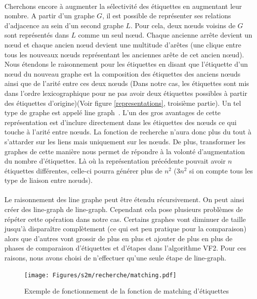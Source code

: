 \documentclass[12pt,french,twoside]{report}
\begin{document}
\paragraph{}Cherchons encore à augmenter la sélectivité des étiquettes en augmentant leur nombre. A partir d'un graphe $G$, il est
possible de représenter ses relations d'adjacence au sein d'un second graphe $L$. Pour cela, deux n\oe{}uds voisins de $G$ sont
représentés dans $L$ comme un seul n\oe{}ud. Chaque ancienne arrête devient un n\oe{}ud et chaque ancien n\oe{}ud devient une multitude
d'arêtes (une clique entre tous les nouveaux n\oe{}uds représentant les anciennes arête de cet ancien n\oe{}ud). Nous étendons le 
raisonnement pour les étiquettes en disant que l'étiquette d'un n\oe{}ud du nouveau graphe est la composition des étiquettes des anciens
n\oe{}uds ainsi que de l'arité entre ces deux n\oe{}uds (Dans notre cas, les étiquettes sont mis dans l'ordre lexicographique pour ne pas
avoir deux étiquettes possibles à partir des étiquettes d'origine)(Voir figure \ref{representations},
troisième partie). Un tel type de graphe est appelé line graph~\cite{orlin_line-digraphs_1978}. L'un des
gros avantages de cette représentation est d'inclure directement dans les étiquettes des n\oe{}uds ce qui touche à l'arité entre n\oe{}uds.
La fonction
de recherche n'aura donc plus du tout à s'attarder sur les liens mais uniquement sur les n\oe{}uds. De plus, transformer les graphes
de cette manière nous permet de répondre à la volonté d'augmentation du nombre d'étiquettes. Là où la représentation précédente
pouvait avoir $n$ étiquettes différentes, celle-ci pourra générer plus de $n^2$ ($3n^2$ si on compte tous les type de liaison entre
n\oe{}uds).

\paragraph{}Le raisonnement des line graphe peut être étendu récursivement. On peut ainsi créer des line-graph de line-graph.
Cependant cela pose plusieurs problèmes de répéter cette opération dans notre cas. Certains graphes vont diminuer de taille
jusqu'à disparaître complètement (ce qui est peu pratique pour la comparaison) alors que d'autres vont grossir de plus en plus
et ajouter de plus en plus de phases de comparaison d'étiquettes et d'étapes dans l'algorithme VF2. Pour ces raisons, nous avons
choisi de n'effectuer qu'une seule étape de line-graph.

\begin{figure}[!ht]
  \texttt{[image: Figures/s2m/recherche/matching.pdf]}
  \caption{\label{label_matching}Exemple de fonctionnement de la fonction de matching d'étiquettes}
\end{figure}
\end{document}

